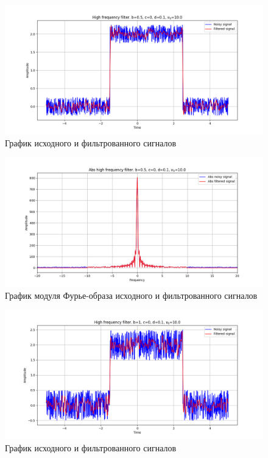 \documentclass[a4paper, 12pt]{article}
\begin{document}
    \begin{figure}[!htb]
        \centering
        \includegraphics[scale=0.485]{1_u_flt_u_nohigh.png}
        \captionsetup{skip=0pt}
        \caption{График исходного и фильтрованного сигналов}
        \label{fig:fig1}
    \end{figure}
    \begin{figure}[!htb]
        \centering
        \includegraphics[scale=0.485]{1_abs_u_U_nohigh.png}
        \captionsetup{skip=0pt}
        \caption{График модуля Фурье-образа исходного и фильтрованного сигналов}
        \label{fig:fig2}
    \end{figure}
    \begin{figure}[!htb]
        \centering
        \includegraphics[scale=0.485]{2_u_flt_u_nohigh.png}
        \captionsetup{skip=0pt}
        \caption{График исходного и фильтрованного сигналов}
        \label{fig:fig3}
    \end{figure}
\end{document}
